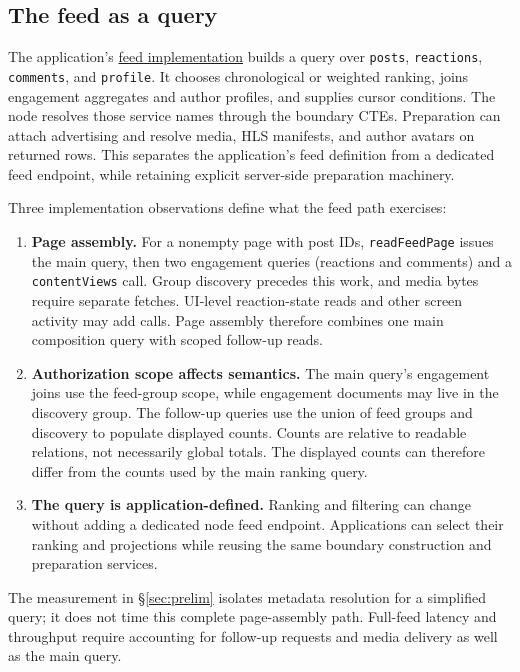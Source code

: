 \documentclass[sigconf, nonacm]{acmart}
\newcommand{\artifactbase}{https://github.com/jacoby149/web10}
\newcommand{\artifactrev}{317fa349eae714ddde07f249ca65cdaa34b6459b}
\newcommand{\artifactfile}[2]{\href{\artifactbase/blob/\artifactrev/#1}{#2}}
\begin{document}
\subsection{The feed as a query}

The application's \artifactfile{marketing/web10-social/src/data/feed.ts}{feed implementation}
builds a query over \texttt{posts}, \texttt{reactions},
\texttt{comments}, and \texttt{profile}. It chooses chronological or weighted
ranking, joins engagement aggregates and author profiles, and supplies cursor
conditions. The node resolves those service names through the boundary CTEs.
Preparation can attach advertising and resolve media, HLS manifests, and author
avatars on returned rows. This separates the application's feed definition
from a dedicated feed endpoint, while retaining explicit server-side
preparation machinery.

Three implementation observations define what the feed path exercises:

\begin{enumerate}[leftmargin=*,nosep]
  \item \textbf{Page assembly.} For a nonempty page with post IDs,
  \texttt{readFeedPage} issues the main query, then two engagement queries
  (reactions and comments) and a \texttt{contentViews} call. Group discovery
  precedes this work, and media bytes require separate fetches. UI-level
  reaction-state reads and other screen activity may add calls. Page assembly
  therefore combines one main composition query with scoped follow-up reads.
  \item \textbf{Authorization scope affects semantics.} The main query's
  engagement joins use the feed-group scope, while engagement documents may
  live in the discovery group. The follow-up queries use the union of feed
  groups and discovery to populate displayed counts. Counts are relative to
  readable relations, not necessarily global totals. The displayed counts
  can therefore differ from the counts used by the main ranking query.
  \item \textbf{The query is application-defined.} Ranking and filtering can
  change without adding a dedicated node feed endpoint. Applications can select
  their ranking and projections while reusing the same boundary construction
  and preparation services.
\end{enumerate}

The measurement in \S\ref{sec:prelim} isolates metadata resolution for a
simplified query; it does not time this complete page-assembly path. Full-feed
latency and throughput require accounting for follow-up requests and media
delivery as well as the main query.
\end{document}
